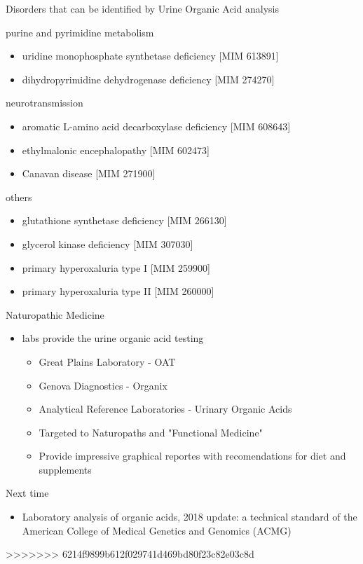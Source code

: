 \documentclass[presentation]{beamer}
\begin{document}
\begin{frame}[label={sec:orgheadline12}]{Disorders that can be identified by Urine Organic Acid analysis}
\begin{block}{purine and pyrimidine metabolism}
\begin{itemize}
\item uridine monophosphate synthetase deficiency [MIM 613891]
\item dihydropyrimidine dehydrogenase deficiency [MIM 274270]
\end{itemize}
\end{block}
\begin{block}{neurotransmission}
\begin{itemize}
\item aromatic L-amino acid decarboxylase deficiency [MIM 608643]
\item ethylmalonic encephalopathy [MIM 602473]
\item Canavan disease [MIM 271900]
\end{itemize}
\end{block}
\begin{block}{others}
\begin{itemize}
\item glutathione synthetase deficiency [MIM 266130]
\item glycerol kinase deficiency [MIM 307030]
\item primary hyperoxaluria type I [MIM 259900]
\item primary hyperoxaluria type II [MIM 260000]
\end{itemize}
\end{block}
\end{frame}


\begin{frame}[label={sec:orgheadline13}]{Naturopathic Medicine}
\begin{itemize}
\item labs provide the urine organic acid testing 
\begin{itemize}
\item Great Plains Laboratory - OAT
\item Genova Diagnostics - Organix
\item Analytical Reference Laboratories - Urinary Organic Acids

\item Targeted to Naturopaths and  "Functional Medicine"
\item Provide impressive graphical reportes with recomendations for diet and supplements
\end{itemize}
\end{itemize}
\end{frame}

\begin{frame}[label={sec:orgheadline14}]{Next time}
\begin{itemize}
\item Laboratory analysis of organic acids, 2018 update: a technical
standard of the American College of Medical Genetics and Genomics
(ACMG)
\end{itemize}
>>>>>>> 6214f9899b612f029741d469bd80f23c82e03c8d
\end{frame}
\end{document}
